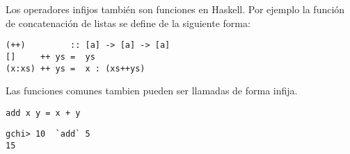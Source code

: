 Los operadores infijos también son funciones en Haskell. Por ejemplo la función de concatenación de listas se define de la siguiente forma:

\begin{lstlisting}
(++)         :: [a] -> [a] -> [a]
[]     ++ ys =  ys
(x:xs) ++ ys =  x : (xs++ys)
\end{lstlisting}

Las funciones comunes tambien pueden ser llamadas de forma infija.

\begin{lstlisting}
add x y = x + y
\end{lstlisting}

\begin{lstlisting}
gchi> 10  `add` 5
15
\end{lstlisting}


